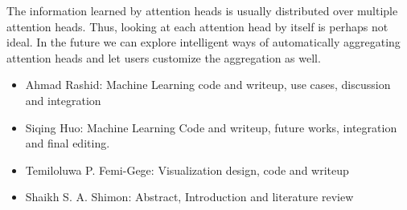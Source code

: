 \documentclass[journal]{vgtc}                %
\begin{document}
The information learned by attention heads is usually distributed over multiple attention heads. Thus, looking at each attention head by itself is perhaps not ideal. In the future we can explore intelligent ways of automatically aggregating attention heads and let users customize the aggregation as well.


\acknowledgments



\begin{itemize}
    \item Ahmad Rashid: Machine Learning code and writeup, use cases, discussion and integration
    \item Siqing Huo: Machine Learning Code and writeup, future works, integration and final editing.
    \item Temiloluwa P. Femi-Gege: Visualization design, code and writeup
    \item Shaikh S. A. Shimon: Abstract, Introduction and literature review
    
\end{itemize}





%

%
%
%


\end{document}
